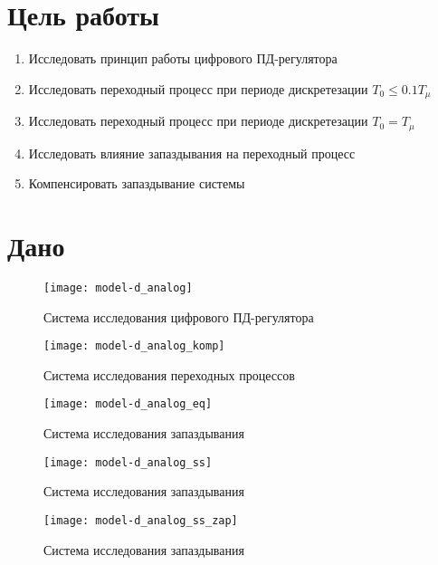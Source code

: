 


    


    \section{Цель работы}
    \begin{enumerate}
        \item Исследовать принцип работы цифрового ПД-регулятора
        \item Исследовать переходный процесс при периоде дискретезации $T_0\leq0.1T_\mu$
        \item Исследовать переходный процесс при периоде дискретезации $T_0=T_\mu$
        \item Исследовать влияние запаздывания на переходный процесс
        \item Компенсировать запаздывание системы
    \end{enumerate}


    \section{Дано}
    \begin{figure}[H]
        \centering\texttt{[image: model-d\_analog]}
        \caption{Система исследования цифрового ПД-регулятора}
    \end{figure}
    \begin{figure}[H]
        \centering\texttt{[image: model-d\_analog\_komp]}
        \caption{Система исследования переходных процессов}
    \end{figure}
    \begin{figure}[H]
        \centering\texttt{[image: model-d\_analog\_eq]}
        \caption{Система исследования запаздывания}
    \end{figure}
    \begin{figure}[H]
        \centering\texttt{[image: model-d\_analog\_ss]}
        \caption{Система исследования запаздывания}
    \end{figure}
    \begin{figure}[H]
        \centering\texttt{[image: model-d\_analog\_ss\_zap]}
        \caption{Система исследования запаздывания}
    \end{figure}

